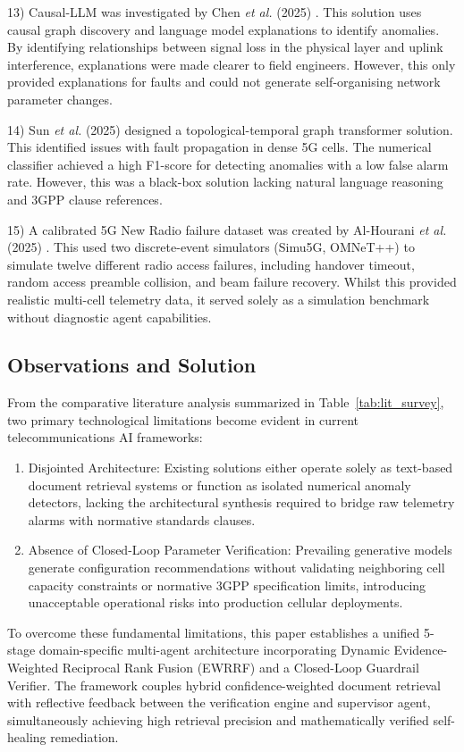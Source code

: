 \documentclass[conference]{IEEEtran}
\begin{document}
13) Causal-LLM was investigated by Chen \textit{et al.} (2025) \cite{chen2025}. This solution uses causal graph discovery and language model explanations to identify anomalies. By identifying relationships between signal loss in the physical layer and uplink interference, explanations were made clearer to field engineers. However, this only provided explanations for faults and could not generate self-organising network parameter changes.

14) Sun \textit{et al.} (2025) \cite{sun2025} designed a topological-temporal graph transformer solution. This identified issues with fault propagation in dense 5G cells. The numerical classifier achieved a high F1-score for detecting anomalies with a low false alarm rate. However, this was a black-box solution lacking natural language reasoning and 3GPP clause references.

15) A calibrated 5G New Radio failure dataset was created by Al-Hourani \textit{et al.} (2025) \cite{alhourani2025}. This used two discrete-event simulators (Simu5G, OMNeT++) to simulate twelve different radio access failures, including handover timeout, random access preamble collision, and beam failure recovery. Whilst this provided realistic multi-cell telemetry data, it served solely as a simulation benchmark without diagnostic agent capabilities.

\subsection{Observations and Solution}
From the comparative literature analysis summarized in Table~\ref{tab:lit_survey}, two primary technological limitations become evident in current telecommunications AI frameworks:
\begin{enumerate}
    \item Disjointed Architecture: Existing solutions either operate solely as text-based document retrieval systems or function as isolated numerical anomaly detectors, lacking the architectural synthesis required to bridge raw telemetry alarms with normative standards clauses.
    \item Absence of Closed-Loop Parameter Verification: Prevailing generative models generate configuration recommendations without validating neighboring cell capacity constraints or normative 3GPP specification limits, introducing unacceptable operational risks into production cellular deployments.
\end{enumerate}

To overcome these fundamental limitations, this paper establishes a unified 5-stage domain-specific multi-agent architecture incorporating Dynamic Evidence-Weighted Reciprocal Rank Fusion (EWRRF) and a Closed-Loop Guardrail Verifier. The framework couples hybrid confidence-weighted document retrieval with reflective feedback between the verification engine and supervisor agent, simultaneously achieving high retrieval precision and mathematically verified self-healing remediation.
\end{document}
